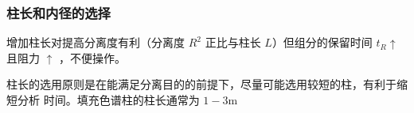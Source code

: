 \subsubsection{柱长和内径的选择}

增加柱长对提高分离度有利（分离度 $R^2$ 正比与柱长 $L$）但组分的保留时间 $t_R
    \uparrow$ 且阻力 $\uparrow$ ，不便操作。

柱长的选用原则是在能满足分离目的的前提下，尽量可能选用较短的柱，有利于缩短分析
时间。填充色谱柱的柱长通常为 $1 - 3 \mathrm{m}$
